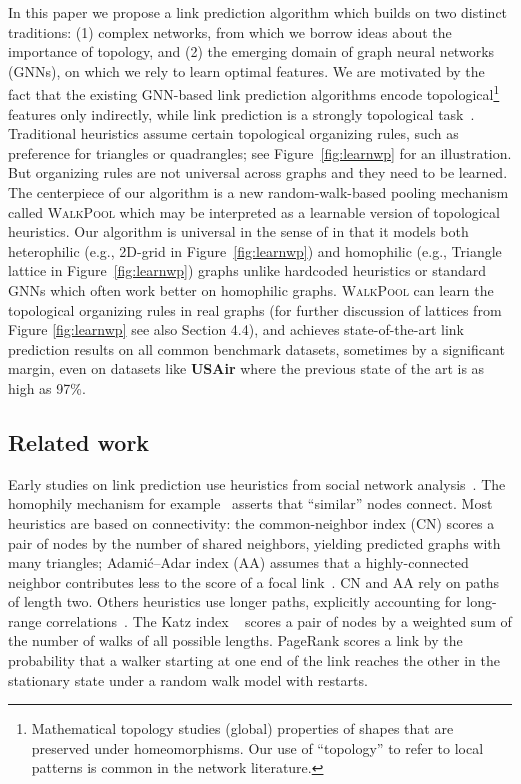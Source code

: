 \documentclass[11pt]{article}
\newcommand{\walkpool}{\textsc{WalkPool}\xspace}
\newcommand{\UPDATE}[1]{\textcolor{WowColor}{{#1}}}
\renewcommand{\UPDATE}[1]{#1}
\begin{document}
In this paper we propose a link prediction algorithm which builds on two distinct traditions: (1) complex networks, from which we borrow ideas about the importance of topology, and (2) the emerging domain of graph neural networks (GNNs), on which we rely to learn optimal features. \UPDATE{We are motivated by the fact that the existing GNN-based link prediction algorithms encode topological\footnote{Mathematical topology studies (global) properties of shapes that are preserved under homeomorphisms. Our use of ``topology'' to refer to  local patterns is common in the network literature.} features only indirectly, while link prediction is a strongly topological task~\citep{lu2011link}. Traditional heuristics assume certain topological organizing rules, such as preference for triangles or quadrangles; see Figure~\ref{fig:learnwp} for an illustration. But organizing rules are not universal across graphs and they need to be learned. The centerpiece of our algorithm is a new random-walk-based pooling mechanism called \walkpool which may be interpreted as a learnable version of topological heuristics. Our algorithm is universal in the sense of \citet{chien2020adaptive} in that it models both heterophilic (e.g., 2D-grid in Figure~\ref{fig:learnwp}) and homophilic (e.g., Triangle lattice in Figure~\ref{fig:learnwp}) graphs unlike hardcoded heuristics or standard GNNs which often work better on homophilic graphs. \walkpool can  learn the topological organizing rules in real graphs (for further discussion of lattices from Figure \ref{fig:learnwp} see also Section 4.4), and achieves state-of-the-art link prediction results on all common benchmark datasets, sometimes by a significant margin, even on datasets like \textbf{USAir} \citep{usair} where the previous state of the art is as high as 97\%.}
\vspace{-2mm}
\subsection{Related work}
\vspace{-2mm}


Early studies on link prediction use heuristics from social network analysis~\citep{lu2011link}. The homophily mechanism for example~\citep{mcpherson2001birds} asserts that ``similar'' nodes connect. Most heuristics are based on connectivity: the common-neighbor index (CN) scores a pair of nodes by the number of shared neighbors, yielding predicted graphs with many triangles; Adami\'c--Adar index (AA) assumes that a highly-connected neighbor contributes less to the score of a focal  link~\citep{adamic2003friends}.
CN and AA rely on paths of length two. Others heuristics use longer paths, explicitly accounting for long-range correlations~\citep{lu2011link}. The Katz index ~\citep{katz1953new} scores a pair of nodes by a weighted sum of the number of walks of all possible lengths. PageRank scores a link by the probability that a walker starting at one end of the link reaches the other in the stationary state under a random walk model with restarts.
\end{document}
